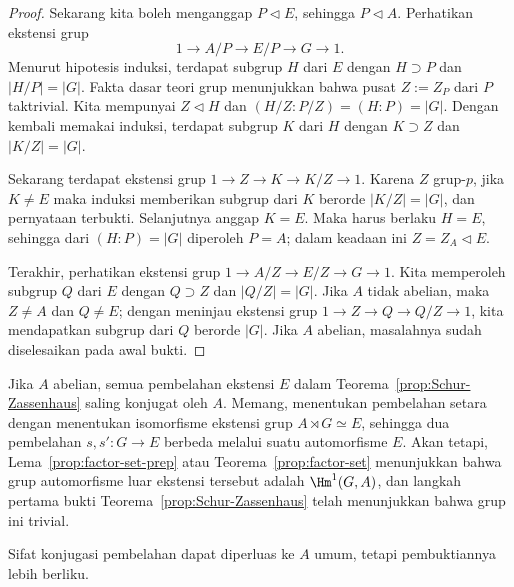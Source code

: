 \begin{proof}
	Sekarang kita boleh menganggap $P\lhd E$, sehingga $P\lhd A$. Perhatikan
	ekstensi grup
	\[ 1\to A/P\to E/P\to G\to1. \]
	Menurut hipotesis induksi, terdapat subgrup $H$ dari $E$ dengan
	$H\supset P$ dan $|H/P|=|G|$. Fakta dasar teori grup menunjukkan bahwa
	pusat $Z:=Z_P$ dari $P$ taktrivial. Kita mempunyai $Z\lhd H$ dan
	$(H/Z:P/Z)=(H:P)=|G|$. Dengan kembali memakai induksi, terdapat subgrup
	$K$ dari $H$ dengan $K\supset Z$ dan $|K/Z|=|G|$.

	Sekarang terdapat ekstensi grup $1\to Z\to K\to K/Z\to1$. Karena $Z$
	grup-$p$, jika $K\neq E$ maka induksi memberikan subgrup dari $K$ berorde
	$|K/Z|=|G|$, dan pernyataan terbukti. Selanjutnya anggap $K=E$. Maka
	harus berlaku $H=E$, sehingga dari $(H:P)=|G|$ diperoleh $P=A$; dalam
	keadaan ini $Z=Z_A\lhd E$.

	Terakhir, perhatikan ekstensi grup
	$1\to A/Z\to E/Z\to G\to1$. Kita memperoleh subgrup $Q$ dari $E$ dengan
	$Q\supset Z$ dan $|Q/Z|=|G|$. Jika $A$ tidak abelian, maka $Z\neq A$ dan
	$Q\neq E$; dengan meninjau ekstensi grup
	$1\to Z\to Q\to Q/Z\to1$, kita mendapatkan subgrup dari $Q$ berorde $|G|$.
	Jika $A$ abelian, masalahnya sudah diselesaikan pada awal bukti.
\end{proof}

Jika $A$ abelian, semua pembelahan ekstensi $E$ dalam
Teorema~\ref{prop:Schur-Zassenhaus} saling konjugat oleh $A$. Memang,
menentukan pembelahan setara dengan menentukan isomorfisme ekstensi grup
$A\rtimes G\simeq E$, sehingga dua pembelahan $s,s':G\to E$ berbeda melalui
suatu automorfisme $E$. Akan tetapi, Lema~\ref{prop:factor-set-prep} atau
Teorema~\ref{prop:factor-set} menunjukkan bahwa grup automorfisme luar
ekstensi tersebut adalah $\Hm^1(G,A)$, dan langkah pertama bukti
Teorema~\ref{prop:Schur-Zassenhaus} telah menunjukkan bahwa grup ini trivial.

Sifat konjugasi pembelahan dapat diperluas ke $A$ umum, tetapi pembuktiannya
lebih berliku.
